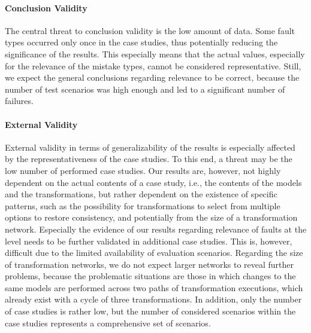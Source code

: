 \paragraph{Conclusion Validity}
The central threat to conclusion validity is the low amount of data.
Some fault types occurred only once in the case studies, thus potentially reducing the significance of the results.
This especially means that the actual values, especially for the relevance of the mistake types, cannot be considered representative.
Still, we expect the general conclusions regarding relevance to be correct, because the number of test scenarios was high enough and led to a significant number of failures.



\paragraph{External Validity}
\label{chap:correctness_evaluation:categorization:discussion:limitations}

External validity in terms of generalizability of the results is especially affected by the representativeness of the case studies.
To this end, a threat may be the low number of performed case studies.
Our results are, however, not highly dependent on the actual contents of a case study, i.e., the contents of the models and the transformations, but rather dependent on the existence of specific patterns, such as the possibility for transformations to select from multiple options to restore consistency, and potentially from the size of a transformation network.
Especially the evidence of our results regarding relevance of faults at the \levelnetworkrule level needs to be further validated in additional case studies.
This is, however, difficult due to the limited availability of evaluation scenarios.
Regarding the size of transformation networks, we do not expect larger networks to reveal further problems, because the problematic situations are those in which changes to the same models are performed across two paths of transformation executions, which already exist with a cycle of three transformations.
In addition, only the number of case studies is rather low, but the number of considered scenarios within the case studies represents a comprehensive set of scenarios.

